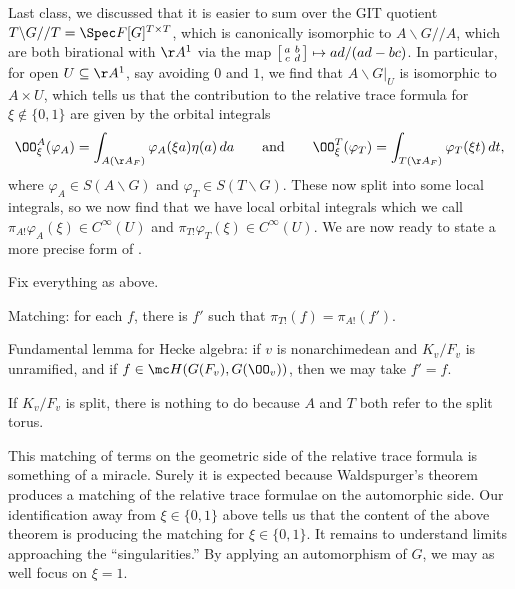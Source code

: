 \documentclass[../notes.tex]{subfiles}
\begin{document}
Last class, we discussed that it is easier to sum over the GIT quotient $T\backslash G//T=\Spec F[G]^{T\times T}$, which is canonically isomorphic to $A\backslash G//A$, which are both birational with $\AA^1$ via the map $\begin{bsmallmatrix}
	a & b \\ c & d
\end{bsmallmatrix}\mapsto ad/(ad-bc)$. In particular, for open $U\subseteq\AA^1$, say avoiding $0$ and $1$, we find that $A\backslash G|_U$ is isomorphic to $A\times U$, which tells us that the contribution to the relative trace formula for $\xi\notin\{0,1\}$ are given by the orbital integrals
\[\OO_\xi^A(\varphi_A)=\int_{A(\AA_F)}\varphi_A(\xi a)\eta(a)\,da\qquad\text{and}\qquad\OO_\xi^T(\varphi_T)=\int_{T(\AA_F)}\varphi_T(\xi t)\,dt,\]
where $\varphi_A\in S(A\backslash G)$ and $\varphi_T\in S(T\backslash G)$. These now split into some local integrals, so we now find that we have local orbital integrals which we call $\pi_{A!}\varphi_A(\xi)\in C^\infty(U)$ and $\pi_{T!}\varphi_T(\xi)\in C^\infty(U)$. We are now ready to state a more precise form of .
\begin{theorem} \label{thm:better-compare}
	Fix everything as above.
	\begin{listalph}
		\item Matching: for each $f$, there is $f'$ such that $\pi_{T!}(f)=\pi_{A!}(f')$.
		\item Fundamental lemma for Hecke algebra: if $v$ is nonarchimedean and $K_v/F_v$ is unramified, and if $f\in\mc H(G(F_v),G(\OO_v))$, then we may take $f'=f$.
	\end{listalph}
\end{theorem}
\begin{remark}
	If $K_v/F_v$ is split, there is nothing to do because $A$ and $T$ both refer to the split torus.
\end{remark}
This matching of terms on the geometric side of the relative trace formula is something of a miracle. Surely it is expected because Waldspurger's theorem produces a matching of the relative trace formulae on the automorphic side. Our identification away from $\xi\in\{0,1\}$ above tells us that the content of the above theorem is producing the matching for $\xi\in\{0,1\}$. It remains to understand limits approaching the ``singularities.'' By applying an automorphism of $G$, we may as well focus on $\xi=1$.
\end{document}
